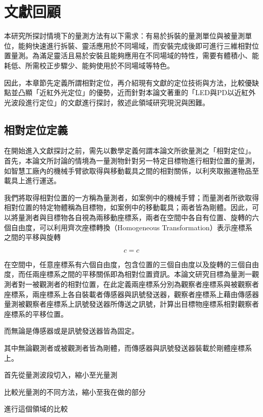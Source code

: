 \chapter{文獻回顧}




\cite{radiometry_and_photometry}


本研究所探討情境下的量測方法有以下需求：有易於拆裝的量測單位與被量測單位，能夠快速進行拆裝、靈活應用於不同場域，而安裝完成後即可進行三維相對位置量測。為滿足靈活且易於安裝且能夠應用在不同場域的特性，需要有體積小、能耗低、所需校正步驟少、能夠使用於不同場域等特色。

因此，本章節先定義所謂相對定位，再介紹現有文獻的定位技術與方法，比較優缺點並凸顯「近紅外光定位」的優勢，近而針對本論文著重的「LED與PD以近紅外光波段進行定位」的文獻進行探討，敘述此領域研究現況與困難。








\section{相對定位定義}

    
    在開始進入文獻探討之前，需先以數學定義何謂本論文所欲量測之「相對定位」。首先，本論文所討論的情境為一量測物針對另一特定目標物進行相對位置的量測，如智慧工廠內的機械手臂欲取得與移動載具之間的相對關係，以利夾取搬運物品至載具上進行運送。
    
    我們將取得相對位置的一方稱為量測者，如案例中的機械手臂；而量測者所欲取得相對位置的特定物體稱為目標物，如案例中的移動載具；兩者皆為剛體。因此，可以將量測者與目標物各自視為兩移動座標系，兩者在空間中各自有位置、旋轉的六個自由度，可以利用齊次座標轉換（Homogeneous Transformation）表示座標系之間的平移與旋轉
  
    \begin{equation}
        \label{eqn:homogeneous}
        c=c
    \end{equation}
    
    在空間中，任意座標系有六個自由度，包含位置的三個自由度以及旋轉的三個自由度，而任兩座標系之間的平移關係即為相對位置資訊。本論文研究目標為量測一觀測者對一被觀測者的相對位置，在此定義兩座標系分別為觀察者座標系與被觀察者座標系，兩座標系上各自裝載者傳感器與訊號發送器，觀察者座標系上藉由傳感器量測被觀察者座標系上訊號發送器所傳送之訊號，計算出目標物座標系相對觀察者座標系的平移位置。
    
    而無論是傳感器或是訊號發送器皆為固定。
    
    其中無論觀測者或被觀測者皆為剛體，而傳感器與訊號發送器裝載於剛體座標系上。

首先從量測波段切入，縮小至光量測

比較光量測的不同方法，縮小至我在做的部分

進行這個領域的比較

